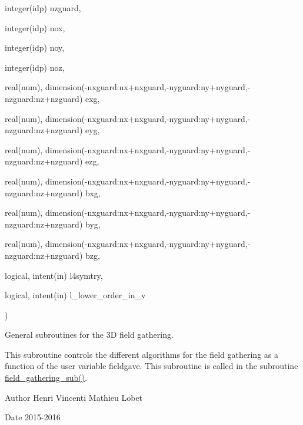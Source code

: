 {\begin{DoxyParamCaption}
\item[{integer(idp)}]{nzguard, }
\item[{integer(idp)}]{nox, }
\item[{integer(idp)}]{noy, }
\item[{integer(idp)}]{noz, }
\item[{real(num), dimension(-\/nxguard\+:nx+nxguard,-\/nyguard\+:ny+nyguard,-\/nzguard\+:nz+nzguard)}]{exg, }
\item[{real(num), dimension(-\/nxguard\+:nx+nxguard,-\/nyguard\+:ny+nyguard,-\/nzguard\+:nz+nzguard)}]{eyg, }
\item[{real(num), dimension(-\/nxguard\+:nx+nxguard,-\/nyguard\+:ny+nyguard,-\/nzguard\+:nz+nzguard)}]{ezg, }
\item[{real(num), dimension(-\/nxguard\+:nx+nxguard,-\/nyguard\+:ny+nyguard,-\/nzguard\+:nz+nzguard)}]{bxg, }
\item[{real(num), dimension(-\/nxguard\+:nx+nxguard,-\/nyguard\+:ny+nyguard,-\/nzguard\+:nz+nzguard)}]{byg, }
\item[{real(num), dimension(-\/nxguard\+:nx+nxguard,-\/nyguard\+:ny+nyguard,-\/nzguard\+:nz+nzguard)}]{bzg, }
\item[{logical, intent(in)}]{l4symtry, }
\item[{logical, intent(in)}]{l\+\_\+lower\+\_\+order\+\_\+in\+\_\+v}
\end{DoxyParamCaption}
)}\hypertarget{field__gathering_8_f90_a97c6b6e6c658ab27a94491501be23409}{}\label{field__gathering_8_f90_a97c6b6e6c658ab27a94491501be23409}


General subroutines for the 3D field gathering. 

This subroutine controls the different algorithms for the field gathering as a function of the user variable fieldgave. This subroutine is called in the subroutine \hyperlink{field__gathering_8_f90_a3048fd8eb5e48d87fa67d382d260b22f}{field\+\_\+gathering\+\_\+sub()}. \begin{DoxyAuthor}{Author}
Henri Vincenti Mathieu Lobet 
\end{DoxyAuthor}
\begin{DoxyDate}{Date}
2015-\/2016 
\end{DoxyDate}
